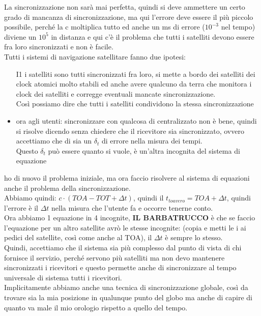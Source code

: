 \documentclass[oneside, 12pt]{extbook}
\begin{document}
La sincronizzazione non sarà mai perfetta, quindi si deve ammettere un certo grado di mancanza di sincronizzazione, ma qui l'errore deve essere il più piccolo possibile, perché la c moltiplica tutto ed anche un ms di errore ($10^{-3}$ nel tempo) diviene un $10^5$ in distanza e qui c'è il problema che tutti i satelliti devono essere fra loro sincronizzati e non è facile.\\
Tutti i sistemi di navigazione satellitare fanno due ipotesi:
\begin{itemize}
	\item[I1] i satelliti sono tutti sincronizzati fra loro, si mette a bordo dei satelliti dei clock atomici molto stabili ed anche avere qualcuno da terra che monitora i clock dei satelliti e corregge eventuali mancate sincronizzazione.\\
	Così possiamo dire che tutti i satelliti condividono la stessa sincronizzazione
	\item ora agli utenti: sincronizzare con qualcosa di centralizzato non è bene, quindi si risolve dicendo senza chiedere che il ricevitore sia sincronizzato, ovvero accettiamo che di sia un $\delta_t$ di errore nella misura dei tempi.\\
	Questo $\delta_t$ può essere quanto si vuole, è un'altra incognita del sistema di equazione
\end{itemize}
ho di nuovo il problema iniziale, ma ora faccio risolvere al sistema di equazioni anche il problema della sincronizzazione.\\
Abbiamo quindi:
$c \cdot (TOA - TOT + \Delta t)$, quindi il $t_{toavero} = TOA + \Delta t$, quindi l'errore è il $\Delta t$ nella misura che l'utente fa e occorre tenerne conto.\\
Ora abbiamo 1 equazione in 4 incognite, \textbf{IL BARBATRUCCO} è che se faccio l'equazione per un altro satellite avrò le stesse incognite:
(copia e metti le i ai pedici del satellite, così come anche al TOA), il $\Delta t$ è sempre lo stesso.\\
Quindi, accettiamo che il sistema sia più complesso dal punto di vista di chi fornisce il servizio, perché servono più satelliti ma non devo mantenere sincronizzati i ricevitori e questo permette anche di sincronizzare al tempo universale di sistema tutti i ricevitori.\\
Implicitamente abbiamo anche una tecnica di sincronizzazione globale, così da trovare sia la mia posizione in qualunque punto del globo ma anche di capire di quanto va male il mio orologio rispetto a quello del tempo.\\
\end{document}
